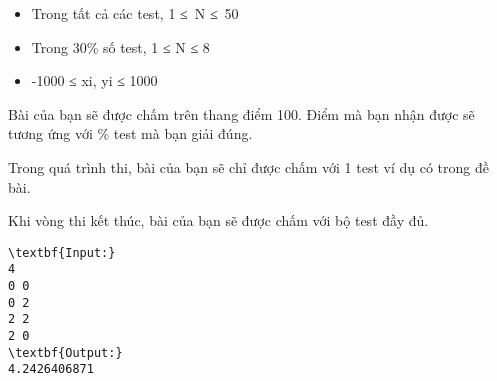 \begin{itemize}
	\item     Trong tất cả các test, 1 ≤ N ≤ 50   
	\item     Trong 30\% số test, 1 ≤ N ≤ 8   
	\item     -1000 ≤ xi, yi ≤ 1000   
\end{itemize}
Bài của bạn sẽ được chấm trên thang điểm 100. Điểm mà bạn nhận được sẽ tương ứng với \% test mà bạn giải đúng.  

   Trong quá trình thi, bài của bạn sẽ chỉ được chấm với 1 test ví dụ có trong đề bài.  

   Khi vòng thi kết thúc, bài của bạn sẽ được chấm với bộ test đầy đủ.
\begin{verbatim}
\textbf{Input:}
4
0 0
0 2
2 2
2 0
\textbf{Output:}
4.2426406871\end{verbatim}